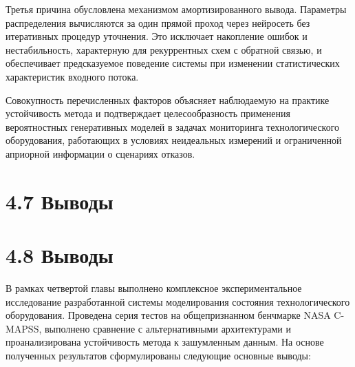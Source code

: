 \documentclass[14pt, a4paper, oneside]{extreport}
\begin{document}
Третья причина обусловлена механизмом амортизированного вывода. Параметры распределения вычисляются за один прямой проход через нейросеть без итеративных процедур уточнения. Это исключает накопление ошибок и нестабильность, характерную для рекуррентных схем с обратной связью, и обеспечивает предсказуемое поведение системы при изменении статистических характеристик входного потока.

Совокупность перечисленных факторов объясняет наблюдаемую на практике устойчивость метода и подтверждает целесообразность применения вероятностных генеративных моделей в задачах мониторинга технологического оборудования, работающих в условиях неидеальных измерений и ограниченной априорной информации о сценариях отказов.



\vspace{1em}
\section{4.7 Выводы}
\vspace{1em}
\section{4.8 Выводы}

В рамках четвертой главы выполнено комплексное экспериментальное исследование разработанной системы моделирования состояния технологического оборудования. Проведена серия тестов на общепризнанном бенчмарке NASA C-MAPSS, выполнено сравнение с альтернативными архитектурами и проанализирована устойчивость метода к зашумленным данным. На основе полученных результатов сформулированы следующие основные выводы:
\end{document}
